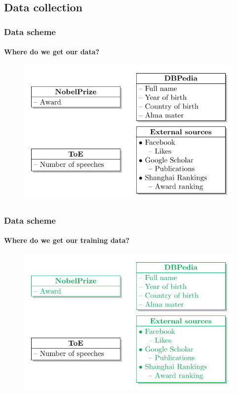 \documentclass[nonav,sleutel]{beamer}
\begin{document}
\subsection{Data collection}
\begin{frame}
\frametitle{Data scheme}
\framesubtitle{Where do we get our data?}

\begin{figure}
	\includegraphics{images/dataschema_original}
\end{figure}

\end{frame}

\begin{frame}
\frametitle{Data scheme}
\framesubtitle{Where do we get our \textbf{\textcolor{Green7}{training}} data?}

\begin{figure}
	\includegraphics{images/dataschema_training}
\end{figure}

\end{frame}
\end{document}

